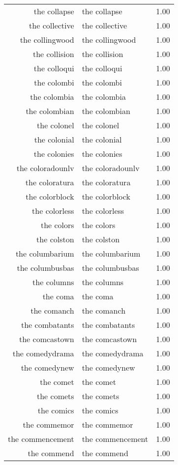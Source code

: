\begin{table}[ht]
\begin{tabular}{rlr}
  the collapse & the collapse & 1.00 \\ 
  the collective & the collective & 1.00 \\ 
  the collingwood & the collingwood & 1.00 \\ 
  the collision & the collision & 1.00 \\ 
  the colloqui & the colloqui & 1.00 \\ 
  the colombi & the colombi & 1.00 \\ 
  the colombia & the colombia & 1.00 \\ 
  the colombian & the colombian & 1.00 \\ 
  the colonel & the colonel & 1.00 \\ 
  the colonial & the colonial & 1.00 \\ 
  the colonies & the colonies & 1.00 \\ 
  the coloradounlv & the coloradounlv & 1.00 \\ 
  the coloratura & the coloratura & 1.00 \\ 
  the colorblock & the colorblock & 1.00 \\ 
  the colorless & the colorless & 1.00 \\ 
  the colors & the colors & 1.00 \\ 
  the colston & the colston & 1.00 \\ 
  the columbarium & the columbarium & 1.00 \\ 
  the columbusbas & the columbusbas & 1.00 \\ 
  the columns & the columns & 1.00 \\ 
  the coma & the coma & 1.00 \\ 
  the comanch & the comanch & 1.00 \\ 
  the combatants & the combatants & 1.00 \\ 
  the comcastown & the comcastown & 1.00 \\ 
  the comedydrama & the comedydrama & 1.00 \\ 
  the comedynew & the comedynew & 1.00 \\ 
  the comet & the comet & 1.00 \\ 
  the comets & the comets & 1.00 \\ 
  the comics & the comics & 1.00 \\ 
  the commemor & the commemor & 1.00 \\ 
  the commencement & the commencement & 1.00 \\ 
  the commend & the commend & 1.00 \\ 

\end{tabular}
\end{table}

